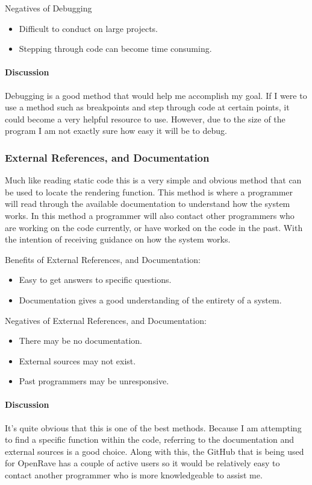 \documentclass[10pt,journal,compsoc,draftclsnofoot]{IEEEtran}
\begin{document}
Negatives of Debugging
\begin{itemize}
\item Difficult to conduct on large projects.
\item Stepping through code can become time consuming.
\end{itemize}

\paragraph{Discussion}
Debugging is a good method that would help me accomplish my goal.
If I were to use a method such as breakpoints and step through code at certain points, it could become a very helpful resource to use.
However, due to the size of the program I am not exactly sure how easy it will be to debug.

\subsubsection{External References, and Documentation}
Much like reading static code this is a very simple and obvious method that can be used to locate the rendering function.
This method is where a programmer will read through the available documentation to understand how the system works.
In this method a programmer will also contact other programmers who are working on the code currently, or have worked on the code in the past.
With the intention of receiving guidance on how the system works.

Benefits of External References, and Documentation:
\begin{itemize}
\item Easy to get answers to specific questions.
\item Documentation gives a good understanding of the entirety of a system.
\end{itemize}

Negatives of External References, and Documentation:
\begin{itemize}
\item There may be no documentation.
\item External sources may not exist.
\item Past programmers may be unresponsive.
\end{itemize}

\paragraph{Discussion}
It's quite obvious that this is one of the best methods.
Because I am attempting to find a specific function within the code, referring to the documentation and external sources is a good choice.
Along with this, the GitHub that is being used for OpenRave has a couple of active users so it would be relatively easy to contact another programmer who is more knowledgeable to assist me.
\end{document}
